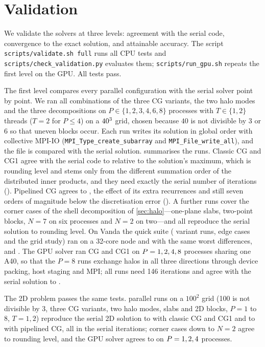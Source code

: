 \documentclass[10pt,a4paper]{article}
\newcommand{\code}[1]{\texttt{#1}}
\begin{document}
\section{Validation}\label{sec:validation}

We validate the solvers at three levels: agreement with the serial code, convergence to the exact
solution, and attainable accuracy. The script \code{scripts/validate.sh full} runs all CPU tests and
\code{scripts/check\_validation.py} evaluates them; \code{scripts/run\_gpu.sh} repeats the first level on
the GPU. All tests pass.

The first level compares every parallel configuration with the serial solver point by point. We ran all
combinations of the three CG variants, the two halo modes and the three decompositions on
$P\in\{1,2,3,4,6,8\}$ processes with $T\in\{1,2\}$ threads ($T=2$ for $P\le4$) on a $40^3$ grid, chosen
because $40$ is not divisible by 3 or 6 so that uneven blocks occur. Each run writes its solution in
global order with collective MPI-IO (\code{MPI\_Type\_create\_subarray} and \code{MPI\_File\_write\_all}),
and the file is compared with the serial solution.  summarises the \ValRuns{} runs.
Classic CG and CG1 agree with the serial code to \ValWorstCG{} relative to the solution's maximum, which is
rounding level and stems only from the different summation order of the distributed inner products, and
they need exactly the serial number of iterations (\ValIters). Pipelined CG agrees to \ValWorstPipe{}, the
effect of its extra recurrences and still seven orders of magnitude below the discretisation error
(\ValErrMax). A further \ValEdge{} runs cover the corner cases of the shell decomposition of
\cref{sec:halo}---one-plane slabs, two-point blocks, $N=7$ on six processes and $N=2$ on two---and all
reproduce the serial solution to rounding level. On Vanda the quick suite (\NodeValRuns{} variant runs,
\NodeValEdge{} edge cases and the grid study) ran on a 32-core \NodeCPU{} node and \NodeValResult{} with
the same worst differences, \NodeValCG{} and \NodeValPipe. The GPU solver ran CG and CG1 on $P=1, 2, 4, 8$
processes sharing one A40, so that the $P=8$ runs exchange halos in all three directions through device
packing, host staging and MPI; all \GpuValRuns{} runs need 146 iterations and agree with the serial solution
to \GpuValWorst.

The 2D problem passes the same tests. \ValTwoRuns{} parallel runs on a $100^2$ grid (100 is not divisible
by 3, three CG variants, two halo modes, slabs and 2D blocks, $P=1$ to $8$, $T=1,2$) reproduce the serial
2D solution to \ValTwoWorstCG{} with classic CG and CG1 and to \ValTwoWorstPipe{} with pipelined CG, all
in the serial \ValTwoIters{} iterations; \ValTwoEdge{} corner cases down to $N=2$ agree to rounding level,
and the GPU solver agrees to \GpuValTwoWorst{} on $P=1, 2, 4$ processes.
\end{document}
